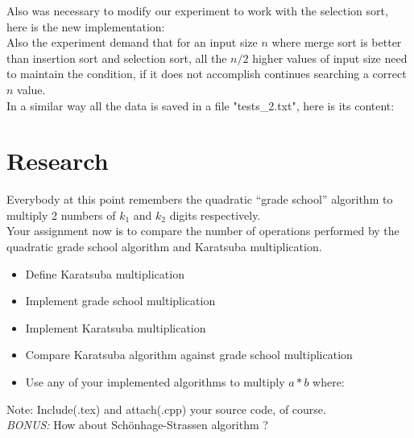 \documentclass[12pt]{article}
\begin{document}
Also was necessary to modify our experiment to work with the selection sort, here is the new implementation:\\


Also the experiment demand that for an input size $n$ where merge sort is better than insertion sort and selection sort, all the $n/2$ higher values of input size need to maintain the condition, if it does not accomplish continues searching a correct $n$ value.\\

In a similar way all the data is saved in a file "tests\_2.txt", here is its content:



\section{Research}

Everybody at this point remembers the quadratic ``grade school'' algorithm to multiply 2 numbers of $k_{1}$ and $k_{2}$ digits respectively. \\

Your assignment now is to compare the number of operations performed by the quadratic grade school algorithm and Karatsuba multiplication.

\begin{itemize}
    \item Define Karatsuba multiplication
    \item Implement grade school multiplication
    \item Implement Karatsuba multiplication
    \item Compare Karatsuba algorithm against grade school multiplication
    \item Use any of your implemented algorithms to multiply $a*b$ where:
\end{itemize}

Note: Include(.tex) and attach(.cpp) your source code, of course.\\

\emph{BONUS:} How about Sch\"{o}nhage-Strassen algorithm ?
\end{document}
